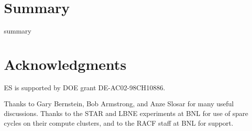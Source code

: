 \documentclass[12pt,preprint]{aastex}
\begin{document}
\section{Summary} \label{sec:summary}

summary

\section*{Acknowledgments}

ES is supported by DOE grant DE-AC02-98CH10886.

Thanks to Gary Bernstein, Bob Armstrong, and Anze Slosar for many useful
discussions.  Thanks to the STAR and LBNE experiments at BNL for use of spare
cycles on their compute clusters, and to the RACF staff at BNL for support.




\end{document}
